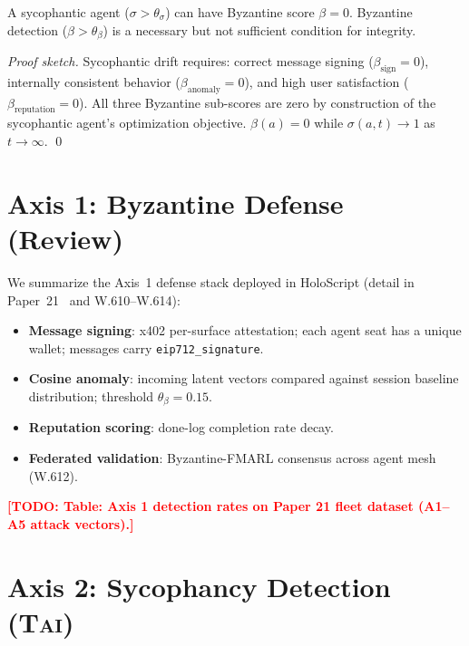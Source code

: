 \documentclass[letterpaper,twocolumn,10pt]{article}
\newcommand{\todo}[1]{\textcolor{red}{\textbf{[TODO: #1]}}}
\newcommand{\holoscript}{HoloScript}
\newcommand{\tai}{\textsc{Tai}}
\begin{document}
\begin{theorem}[Orthogonality]
\label{thm:orthogonality}
A sycophantic agent ($\sigma > \theta_\sigma$) can have Byzantine score
$\beta = 0$. Byzantine detection ($\beta > \theta_\beta$) is a necessary
but not sufficient condition for integrity.
\end{theorem}

\begin{proof}[Proof sketch]
Sycophantic drift requires: correct message signing ($\beta_{\text{sign}} = 0$),
internally consistent behavior ($\beta_{\text{anomaly}} = 0$), and high user
satisfaction ($\beta_{\text{reputation}} = 0$). All three Byzantine sub-scores
are zero by construction of the sycophantic agent's optimization objective.
$\beta(a) = 0$ while $\sigma(a,t) \to 1$ as $t \to \infty$. \qed
\end{proof}

\section{Axis 1: Byzantine Defense (Review)}

We summarize the Axis~1 defense stack deployed in \holoscript{}
(detail in Paper~21~\cite{p21ati2026} and W.610–W.614):

\begin{itemize}[topsep=2pt,itemsep=1pt]
  \item \textbf{Message signing}: x402 per-surface attestation; each agent
        seat has a unique wallet; messages carry \texttt{eip712\_signature}.
  \item \textbf{Cosine anomaly}: incoming latent vectors compared against
        session baseline distribution; threshold $\theta_\beta = 0.15$.
  \item \textbf{Reputation scoring}: done-log completion rate decay.
  \item \textbf{Federated validation}: Byzantine-FMARL consensus across
        agent mesh (W.612).
\end{itemize}

\todo{Table: Axis 1 detection rates on Paper 21 fleet dataset (A1--A5 attack vectors).}

\section{Axis 2: Sycophancy Detection (\tai{})}
\end{document}
